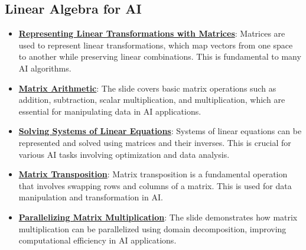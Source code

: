\documentclass{article}%
\begin{document}
\subsection{Linear Algebra for AI}%
\label{subsec:LinearAlgebraforAI}%
\begin{itemize}[leftmargin=*]%
\item \href{https://purdue.brightspace.com/d2l/common/assets/pdfjs-d2l-dist/1.0.14-legacy/web/viewer.html?file=%2Fcontent%2Fenforced%2F1095467-wl.202510.CS.24300.001%2F04L1-Linear Algebra Primer.pdf%3Fou%3D1095467&lang=en-us&container=d2l-fileviewer-rendered-pdf&fullscreen=d2l-fileviewer-rendered-pdf-dialog&height=667#page=5}{\textbf{Representing Linear Transformations with Matrices}}: Matrices are used to represent linear transformations, which map vectors from one space to another while preserving linear combinations. This is fundamental to many AI algorithms.%
\item \href{https://purdue.brightspace.com/d2l/common/assets/pdfjs-d2l-dist/1.0.14-legacy/web/viewer.html?file=%2Fcontent%2Fenforced%2F1095467-wl.202510.CS.24300.001%2F04L1-Linear Algebra Primer.pdf%3Fou%3D1095467&lang=en-us&container=d2l-fileviewer-rendered-pdf&fullscreen=d2l-fileviewer-rendered-pdf-dialog&height=667#page=9}{\textbf{Matrix Arithmetic}}: The slide covers basic matrix operations such as addition, subtraction, scalar multiplication, and multiplication, which are essential for manipulating data in AI applications.%
\item \href{https://purdue.brightspace.com/d2l/common/assets/pdfjs-d2l-dist/1.0.14-legacy/web/viewer.html?file=%2Fcontent%2Fenforced%2F1095467-wl.202510.CS.24300.001%2F04L1-Linear Algebra Primer.pdf%3Fou%3D1095467&lang=en-us&container=d2l-fileviewer-rendered-pdf&fullscreen=d2l-fileviewer-rendered-pdf-dialog&height=667#page=11}{\textbf{Solving Systems of Linear Equations}}: Systems of linear equations can be represented and solved using matrices and their inverses. This is crucial for various AI tasks involving optimization and data analysis.%
\item \href{https://purdue.brightspace.com/d2l/common/assets/pdfjs-d2l-dist/1.0.14-legacy/web/viewer.html?file=%2Fcontent%2Fenforced%2F1095467-wl.202510.CS.24300.001%2F04L1-Linear Algebra Primer.pdf%3Fou%3D1095467&lang=en-us&container=d2l-fileviewer-rendered-pdf&fullscreen=d2l-fileviewer-rendered-pdf-dialog&height=667#page=16}{\textbf{Matrix Transposition}}: Matrix transposition is a fundamental operation that involves swapping rows and columns of a matrix. This is used for data manipulation and transformation in AI.%
\item \href{https://purdue.brightspace.com/d2l/common/assets/pdfjs-d2l-dist/1.0.14-legacy/web/viewer.html?file=%2Fcontent%2Fenforced%2F1095467-wl.202510.CS.24300.001%2F04L1-Linear Algebra Primer.pdf%3Fou%3D1095467&lang=en-us&container=d2l-fileviewer-rendered-pdf&fullscreen=d2l-fileviewer-rendered-pdf-dialog&height=667#page=18}{\textbf{Parallelizing Matrix Multiplication}}: The slide demonstrates how matrix multiplication can be parallelized using domain decomposition, improving computational efficiency in AI applications.%
\end{itemize}
\end{document}

